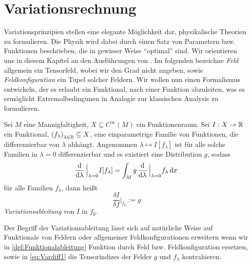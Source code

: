 \section{Variationsrechnung}
Variationsprinzipien stellen eine elegante Möglichkeit dar, physikalische
Theorien zu formulieren. Die Physik wird dabei durch einen Satz
von Parametern bzw. Funktionen beschrieben, die in gewisser Weise "`optimal"'
sind.
Wir orientieren uns in diesem Kapitel an den Ausführungen von 
\cite[s.454 ff]{wald2010general}.
Im folgenden bezeichne \emph{Feld} allgemein ein Tensorfeld, wobei wir den
Grad nicht angeben, sowie \emph{Feldkonfiguration} ein Tupel solcher
Feldern. 
Wir wollen nun einen Formalismus entwickeln, der es erlaubt ein Funktional, nach
einer Funktion abzuleiten, was es ermöglicht Extremalbedingunen in Analogie zur
klassischen Analysis zu formulieren.
\begin{definition}[Funktionalableitung] 
\label{def:Funktionalableitung}
Sei $M$ eine Mannigfaltigkeit,
$X\subseteq C^\infty(M)$ ein Funktionenraum. Sei $I:X\to \mathbb{R}$ ein Funktional,
$\left(f_\lambda\right)_{\lambda\in \Reals}\subseteq X$, eine einparametrige
Familie von Funktionen, die differenzierbar von $\lambda$ abhängt.
Angenommen $\lambda\mapsto I\left[f_\lambda\right]$ ist für alle solche Familien
in $\lambda=0$ differenzierbar und es existiert eine Distribution $g$, sodass
 \begin{equation}
 \dod{}{\lambda}\Big|_{\lambda=0}I[f_\lambda]
 =\int_M g\dod{}{\lambda}\Big|_{\lambda=0}f_\lambda\dif x\,
 \label{eq:Vardiff1}
 \end{equation}
 für alle Familien $f_\lambda$, dann heißt
 \begin{equation}
\frac{\delta{I}}{\delta{f}}\bigg|_{f_0}:=g
 \end{equation}
 \emph{Variationsableitung} von $I$ in $f_0$.
\end{definition}
\begin{bemerkung}
Der Begriff der Variationsableitung lässt sich auf natürliche Weise auf 
Funktionale von Feldern oder allgemeiner Feldkonfigurationen erweitern wenn wir
in \autoref{def:Funktionalableitung} Funktion durch Feld bzw. Feldkonfiguration
ersetzen, sowie  in \eqref{eq:Vardiff1} die Tensorindizes der
Felder $g$ und $f_\lambda$ kontrahieren.
\end{bemerkung}
